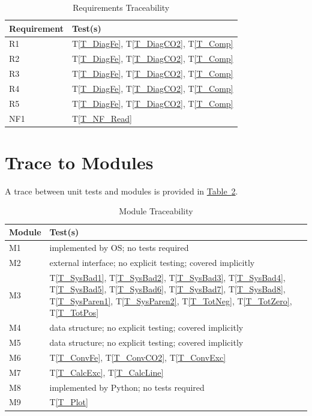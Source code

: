 \documentclass[12pt, titlepage]{article}
\newcommand{\testref}[1]{T\ref{#1}}
\begin{document}
\begin{table}[h]
\caption{Requirements Traceability} \label{tab:reqtrace}
\centering
\begin{tabularx}{0.55\textwidth}{p{4cm}X}
\toprule {\bf Requirement} & {\bf Test(s)}\\
\midrule
R1	&	\testref{T_DiagFe}, \testref{T_DiagCO2}, \testref{T_Comp}\\
R2	&	\testref{T_DiagFe}, \testref{T_DiagCO2}, \testref{T_Comp}\\
R3	&	\testref{T_DiagFe}, \testref{T_DiagCO2}, \testref{T_Comp}\\
R4	&	\testref{T_DiagFe}, \testref{T_DiagCO2}, \testref{T_Comp}\\
R5	&	\testref{T_DiagFe}, \testref{T_DiagCO2}, \testref{T_Comp}\\
NF1 & \testref{T_NF_Read}\\
\bottomrule
\end{tabularx}
\end{table}		
		
\section{Trace to Modules}		
A trace between unit tests and modules is provided in 
\hyperref[tab:modtrace]{Table~\ref*{tab:modtrace}}.

\begin{table}[h]
\caption{Module Traceability} \label{tab:modtrace}
\centering
\begin{tabularx}{0.90\textwidth}{lX}
\toprule {\bf Module} & {\bf Test(s)}\\
\midrule
M1 & implemented by OS; no tests required\\
M2 & external interface; no explicit testing; covered implicitly\\
M3 & \testref{T_SysBad1}, \testref{T_SysBad2}, \testref{T_SysBad3}, 
\testref{T_SysBad4}, \testref{T_SysBad5}, \testref{T_SysBad6}, 
\testref{T_SysBad7}, \testref{T_SysBad8}, \testref{T_SysParen1},
\testref{T_SysParen2}, \testref{T_TotNeg}, \testref{T_TotZero},
\testref{T_TotPos} \\
M4 & data structure; no explicit testing; covered implicitly\\
M5 & data structure; no explicit testing; covered implicitly\\
M6 & \testref{T_ConvFe}, \testref{T_ConvCO2}, \testref{T_ConvExc}\\
M7 & \testref{T_CalcExc}, \testref{T_CalcLine}\\
M8 & implemented by Python; no tests required\\
M9 & \testref{T_Plot}\\
\bottomrule
\end{tabularx}
\end{table}
\end{document}
